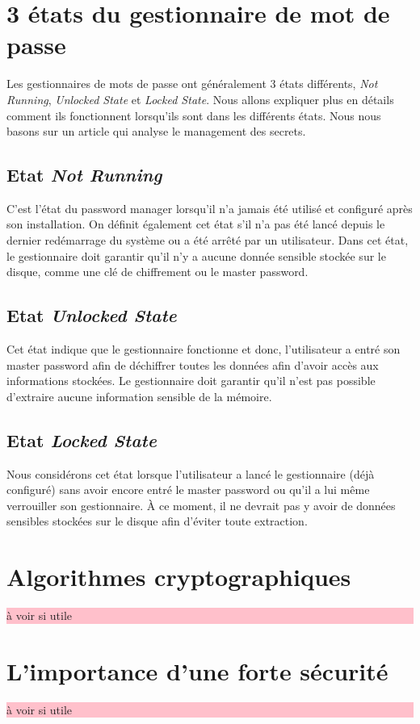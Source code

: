 \section{3 états du gestionnaire de mot de passe}
Les gestionnaires de mots de passe ont généralement 3 états différents, \textit{Not Running}, \textit{Unlocked State} et \textit{Locked State}. Nous allons expliquer plus en détails comment ils fonctionnent lorsqu'ils sont dans les différents états. Nous nous basons sur un article qui analyse le management des secrets\cite{iseexploit}.
\subsection{Etat \textit{Not Running}}
C'est l'état du password manager lorsqu'il n'a jamais été utilisé et configuré après son installation. On définit également cet état s'il n'a pas été lancé depuis le dernier redémarrage du système ou a été arrêté par un utilisateur. Dans cet état, le gestionnaire doit garantir qu'il n'y a aucune donnée sensible stockée sur le disque, comme une clé de chiffrement ou le master password.
\subsection{Etat \textit{Unlocked State}}
Cet état indique que le gestionnaire fonctionne et donc, l'utilisateur a entré son master password afin de déchiffrer toutes les données afin d'avoir accès aux informations stockées. Le gestionnaire doit garantir qu'il n'est pas possible d'extraire aucune information sensible de la mémoire.
\subsection{Etat \textit{Locked State}}
Nous considérons cet état lorsque l'utilisateur a lancé le gestionnaire (déjà configuré) sans avoir encore entré le master password ou qu'il a lui même verrouiller son gestionnaire. À ce moment, il ne devrait pas y avoir de données sensibles stockées sur le disque afin d'éviter toute extraction. 
\section{Algorithmes cryptographiques}
 \colorbox{pink}{\parbox{15cm}{à voir si utile}}
\section{L'importance d'une forte sécurité}
\colorbox{pink}{\parbox{15cm}{à voir si utile}}
